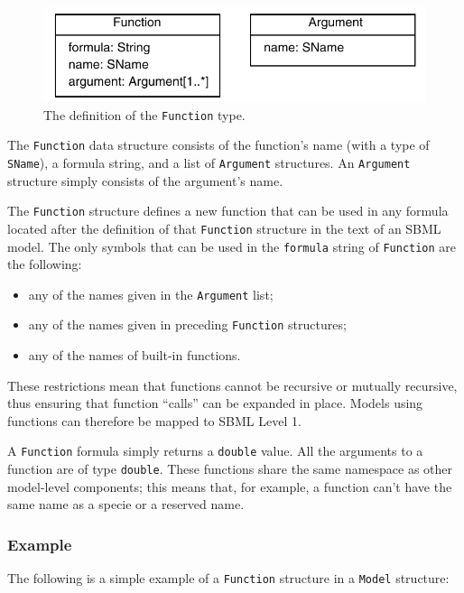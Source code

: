 \documentclass[10pt]{cekarticle}
\begin{document}
\begin{figure}[h]
  \vspace*{15pt}
  \centering
  \includegraphics[scale = 0.7]{function}
  \caption{The definition of the \texttt{Function} type.}
  \label{fig:function}
\end{figure}

The \texttt{Function} data structure consists of the function's name
(with a type of \texttt{SName}), a formula string, and a list of
\texttt{Argument} structures.  An \texttt{Argument} structure simply
consists of the argument's name.

The \texttt{Function} structure defines a new function that can be used in
any formula located after the definition of that \texttt{Function}
structure in the text of an SBML model.  The only symbols that can be used
in the \texttt{formula} string of \texttt{Function} are the following:
\begin{itemize}
\item any of the names given in the \texttt{Argument} list;
\item any of the names given in preceding \texttt{Function} structures;
\item any of the names of built-in functions.
\end{itemize}
These restrictions mean that functions cannot be recursive or mutually
recursive, thus ensuring that function ``calls'' can be expanded in place.
Models using functions can therefore be mapped to SBML Level 1.

A \texttt{Function} formula simply returns a \texttt{double} value.  All
the arguments to a function are of type \texttt{double}.  These functions
share the same namespace as other model-level components; this means that,
for example, a function can't have the same name as a specie or a reserved
name.

\subsubsection{Example}

The following is a simple example of a \texttt{Function}
structure in a \texttt{Model} structure:
\end{document}
